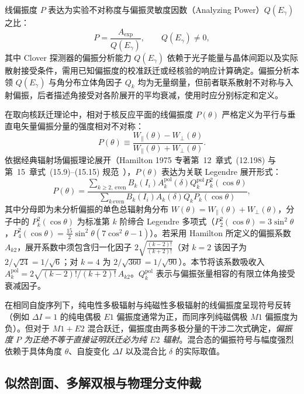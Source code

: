 线偏振度 $P$ 表达为实验不对称度与偏振灵敏度因数（Analyzing Power）$Q(E_\gamma)$ 之比：
\begin{equation}\label{eq:5-7-pol-degree}
P = \frac{A_{\mathrm{exp}}}{Q(E_\gamma)},\qquad Q(E_\gamma)\ne0,
\end{equation}
其中 Clover 探测器的偏振分析能力 $Q(E_\gamma)$ 依赖于光子能量与晶体间距以及实际散射接受条件，需用已知偏振度的校准跃迁或经核验的响应计算确定。偏振分析本领 $Q(E_\gamma)$ 与角分布立体角因子 $Q_k$ 均为无量纲量，但前者联系散射不对称与入射偏振，后者描述角接受对各阶展开的平均衰减，使用时应分别标定和定义。

在取向核跃迁理论中，相对于核反应平面的线偏振度 $P(\theta)$ 严格定义为平行与垂直电矢量偏振分量的强度相对不对称：
\begin{equation}\label{eq:5-7-pol-def}
P(\theta) \equiv \frac{W_\parallel(\theta) - W_\perp(\theta)}{W_\parallel(\theta) + W_\perp(\theta)}.
\end{equation}
依据经典辐射场偏振理论展开（Hamilton 1975 专著第~12~章式~(12.198) 与第~15~章式~(15.9)--(15.15) 规范~\cite{book-hamilton-electromagnetic-interaction}），$P(\theta)$ 表达为关联 Legendre 展开形式：
\begin{equation}\label{eq:5-7-pol-theor}
P(\theta) = \frac{\sum_{k \ge 2, \,\mathrm{even}} B_k(I_i) A_k^{\mathrm{pol}}(\delta) Q_k^{\mathrm{pol}} P_k^2(\cos\theta)}{\sum_{k \,\mathrm{even}} B_k(I_i) A_k(\delta) Q_k P_k(\cos\theta)},
\end{equation}
其中分母即为未分析偏振的单色总辐射角分布 $W(\theta) = W_\parallel(\theta) + W_\perp(\theta)$，分子中的 $P_k^2(\cos\theta)$ 为标准第 $k$ 阶缔合 Legendre 多项式（$P_2^2(\cos\theta) = 3\sin^2\theta$，$P_4^2(\cos\theta) = \frac{15}{2}\sin^2\theta(7\cos^2\theta - 1)$）。若采用 Hamilton 所定义的偏振系数 $A_{k2}$，展开系数中须包含归一化因子 $2\sqrt{\frac{(k-2)!}{(k+2)!}}$（对 $k=2$ 该因子为 $2/\sqrt{24} = 1/\sqrt{6}$；对 $k=4$ 为 $2/\sqrt{360} = 1/\sqrt{90}$）。本节将该系数吸收入 $A_k^{\mathrm{pol}}=2\sqrt{(k-2)!/(k+2)!}\,A_{k2}$。$Q_k^{\mathrm{pol}}$ 表示与偏振张量相容的有限立体角接受衰减因子。

在相同自旋序列下，纯电性多极辐射与纯磁性多极辐射的线偏振度呈现符号反转（例如 $\Delta I = 1$ 的纯电偶极 $E1$ 偏振度通常为正，而同序列纯磁偶极 $M1$ 偏振度为负）。但对于 $M1+E2$ 混合跃迁，偏振度由两多极分量的干涉二次式确定，\emph{偏振度 $P$ 为正绝不等于直接证明跃迁必为纯 $E2$ 辐射}。混合态的偏振符号与幅度强烈依赖于具体角度 $\theta$、自旋变化 $\Delta I$ 以及混合比 $\delta$ 的实际取值。

\subsection{似然剖面、多解双根与物理分支仲裁}\label{subsec:5-7-5}

